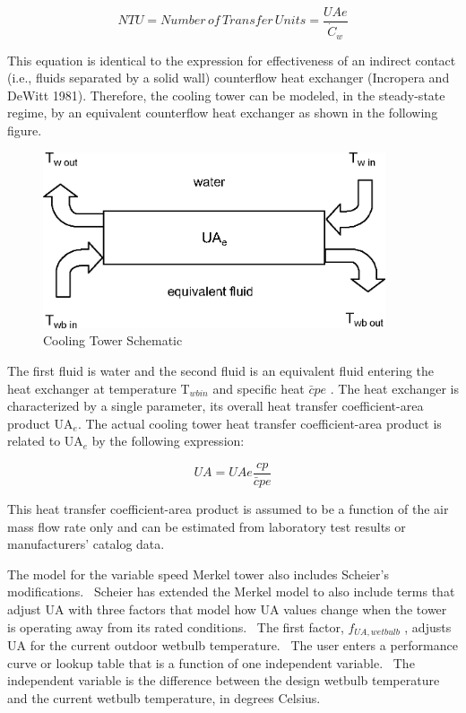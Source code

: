 \begin{equation}
NTU = Number\,of\,Transfer\,Units = \frac{{UAe}}{{{{\dot C}_w}}}
\end{equation}

This equation is identical to the expression for effectiveness of an indirect contact (i.e., fluids separated by a solid wall) counterflow heat exchanger (Incropera and DeWitt 1981). Therefore, the cooling tower can be modeled, in the steady-state regime, by an equivalent counterflow heat exchanger as shown in the following figure.

\begin{figure}[hbtp] %
\centering
\includegraphics[width=0.9\textwidth, height=0.9\textheight, keepaspectratio=true]{media/image4542.png}
\caption{Cooling Tower Schematic \protect \label{fig:cooling-tower-schematic}}
\end{figure}

The first fluid is water and the second fluid is an equivalent fluid entering the heat exchanger at temperature T\(_{wbin}\) and specific heat \(\bar cpe\) . The heat exchanger is characterized by a single parameter, its overall heat transfer coefficient-area product UA\(_{e}\). The actual cooling tower heat transfer coefficient-area product is related to UA\(_{e}\) by the following expression:

\begin{equation}
UA = UAe\frac{{cp}}{{\bar cpe}}
\end{equation}

This heat transfer coefficient-area product is assumed to be a function of the air mass flow rate only and can be estimated from laboratory test results or manufacturers' catalog data.

The model for the variable speed Merkel tower also includes Scheier's modifications.~ Scheier has extended the Merkel model to also include terms that adjust UA with three factors that model how UA values change when the tower is operating away from its rated conditions.~ The first factor, \({f_{UA,wetbulb}}\) , adjusts UA for the current outdoor wetbulb temperature.~ The user enters a performance curve or lookup table that is a function of one independent variable.~ The independent variable is the difference between the design wetbulb temperature and the current wetbulb temperature, in degrees Celsius.

